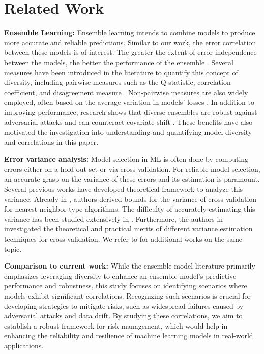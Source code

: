 \section{Related Work}
\textbf{Ensemble Learning:} 
Ensemble learning intends to combine models to produce more accurate and reliable predictions. Similar to our work, the error correlation between these models is of interest. The greater the extent of error independence between the models, the better the performance of the ensemble \cite{Breiman1996BaggingP,Kuncheva2003MeasuresOD}. Several measures have been introduced in the literature to quantify this concept of diversity, including pairwise measures such as the Q-statistic, correlation coefficient, and disagreement measure \cite{Kuncheva2003MeasuresOD, disagreement}. Non-pairwise measures are also widely employed, often based on the average variation in models' losses \cite{Wood2023AUT}. In addition to improving performance, research shows that diverse ensembles are robust against adversarial attacks \cite{Biggio2011, Pang2019ImprovingAR} and can counteract covariate shift \cite{sinha2021dibs}. These benefits have also motivated the investigation into understanding and quantifying model diversity and correlations in this paper. 

\textbf{Error variance analysis:} Model selection in ML is often done by computing errors either on a hold-out set or via cross-validation. For reliable model selection, an accurate grasp on the variance of these errors and its estimation is paramount. Several previous works have developed theoretical framework to analyze this variance. Already in \cite{PatternRecog}, authors derived bounds for the variance of cross-validation for nearest neighbor type algorithms. The difficulty of accurately estimating this variance has been studied extensively in \cite{StatisticalTestsDietterich,InferenceGeneralizationError,NoUnbiasedYoshau}. Furthermore, the authors in \cite{InferenceGeneralizationError} investigated the theoretical and practical merits of different variance estimation techniques for cross-validation. We refer to \cite{BiasErrorEstimation,ResidualVariance,VarianceAnalysisCV,ProblemCV} for additional works on the same topic.

\textbf{Comparison to current work:} While the ensemble model literature primarily emphasizes leveraging diversity to enhance an ensemble model's predictive performance and robustness, this study focuses on identifying scenarios where models exhibit significant correlations. Recognizing such scenarios is crucial for developing strategies to mitigate risks, such as widespread failures caused by adversarial attacks and data drift. By studying these correlations, we aim to establish a robust framework for risk management, which would help in enhancing the reliability and resilience of machine learning models in real-world applications.

